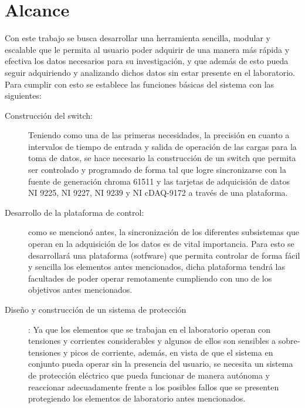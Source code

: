 \chapter{Alcance}
Con este trabajo se busca desarrollar una herramienta sencilla, modular y escalable que le permita al usuario poder adquirir de una manera más rápida y efectiva los datos necesarios para su investigación, y que además de esto pueda seguir adquiriendo y analizando dichos datos sin estar presente en el laboratorio. Para cumplir con esto se establece las funciones básicas del sistema con las siguientes:   

\begin{description}

\item[Construcción del switch:] Teniendo como una de las primeras necesidades, la precisión en cuanto a intervalos de tiempo de entrada y salida de operación de las cargas para la toma de datos, se hace necesario la construcción de un switch que permita ser controlado y programado de forma tal que logre sincronizarse con la fuente de generación chroma 61511 y las tarjetas de adquicisión de datos NI 9225, NI 9227, NI 9239 y NI cDAQ-9172 a través de una plataforma.

\item[Desarrollo de la plataforma de control:] como se mencionó antes, la sincronización de los diferentes subsistemas que operan en la adquisición de los datos es de vital importancia. Para esto se desarrollará una plataforma (sotfware) que permita controlar de forma fácil y sencilla los elementos antes mencionados, dicha plataforma tendrá las facultades de poder operar remotamente cumpliendo con uno de los objetivos antes mencionados.      

\item[Diseño y construcción de un sistema de protección]: Ya que los elementos que se trabajan en el laboratorio operan con tensiones y corrientes considerables y algunos de ellos son sensibles a sobre-tensiones y picos de corriente, además, en vista de que el sistema en conjunto pueda operar sin la presencia del usuario, se necesita un sistema de protección eléctrico que pueda funcionar de manera autónoma y reaccionar adecuadamente frente a los posibles fallos que se presenten protegiendo los elementos de laboratorio antes mencionados.  

 
 
  
  
\end{description} 